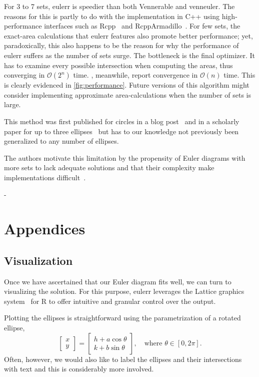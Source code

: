 \documentclass[
  oneside,
  openany,
  numbers=noendperiod,
  parskip=half,
  bibliography=totoc
]{scrbook}\usepackage[]{graphicx}\usepackage{xcolor}
\newlength{\overhang}
\newenvironment{fullwidth}{
  \begin{addmargin*}[0em]{-\overhang}
  }{
  \end{addmargin*}
}
\newcommand{\pkg}[1]{{\fontseries{b}\selectfont #1}}
\begin{document}
For 3 to 7 sets, \pkg{eulerr} is speedier than both \pkg{Vennerable} and
\pkg{venneuler}. The reasons for this is partly to do with the implementation
in C++ using high-performance interfaces such as
\pkg{Rcpp}~\citep{eddelbuettel_2011} and
\pkg{RcppArmadillo}~\citep{eddelbuettel_2014}. For few sets, the exact-area
calculations that \pkg{eulerr} features also promote better performance; yet,
paradoxically, this also happens to be the reason for why the performance of
\pkg{eulerr} suffers as the number of sets surge. The bottleneck is the final
optimizer. It has to examine every possible intersection when computing the
areas, thus converging in $\mathcal{O}(2^n)$ time. \citet{wilkinson_2012},
meanwhile, report convergence in $\mathcal{O}(n)$ time. This is clearly
evidenced in \cref{fig:performance}. Future versions of this algorithm might
consider implementing approximate area-calculations when the number of sets is
large.

This method was first published for circles in a blog
post~\citep{frederickson_2013} and in a scholarly paper for up to three
ellipses~\citep{micallef_2013} but has to our knowledge not previously been
generalized to any number of ellipses.

The authors motivate this limitation by the propensity of Euler diagrams with
more sets to lack adequate solutions and that their complexity make
implementations difficult~\citep{micallef_2013}.
\begin{fullwidth}
\part*{Appendices}
\end{fullwidth}
\appendix
\chapter{Visualization}

Once we have ascertained that our Euler diagram fits well, we can turn to
visualizing the solution. For this purpose, \pkg{eulerr} leverages the
\pkg{Lattice} graphics system~\citep{sarkar_2008} for R to offer intuitive and
granular control over the output.

Plotting the ellipses is straightforward using the parametrization of a rotated
ellipse,
%
\begin{equation*}
\begin{bmatrix}
  x \\ y
\end{bmatrix} =
\begin{bmatrix}
  h + a \cos{\theta} \\
  k + b \sin{\theta}
\end{bmatrix},\quad \text{where } \theta \in [0, 2\pi].
\end{equation*}
%
Often, however, we would also like to label the ellipses and their intersections
with text and this is considerably more involved.
\end{document}
